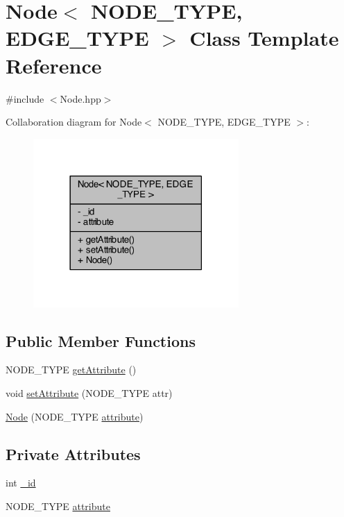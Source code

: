 \hypertarget{class_node}{\section{Node$<$ N\+O\+D\+E\+\_\+\+T\+Y\+P\+E, E\+D\+G\+E\+\_\+\+T\+Y\+P\+E $>$ Class Template Reference}
\label{class_node}
}


{\ttfamily \#include $<$Node.\+hpp$>$}



Collaboration diagram for Node$<$ N\+O\+D\+E\+\_\+\+T\+Y\+P\+E, E\+D\+G\+E\+\_\+\+T\+Y\+P\+E $>$\+:
\nopagebreak
\begin{figure}[H]
\begin{center}
\leavevmode
\includegraphics[width=222pt]{class_node__coll__graph}
\end{center}
\end{figure}
\subsection*{Public Member Functions}
\begin{DoxyCompactItemize}
\item 
N\+O\+D\+E\+\_\+\+T\+Y\+P\+E \hyperlink{class_node_a1272270025389e601164431b42ab5237}{get\+Attribute} ()
\item 
void \hyperlink{class_node_acb8f913ce2f995a6a14b9b05c60938f8}{set\+Attribute} (N\+O\+D\+E\+\_\+\+T\+Y\+P\+E attr)
\item 
\hyperlink{class_node_a94263af6c10cc9882d33918080dc722f}{Node} (N\+O\+D\+E\+\_\+\+T\+Y\+P\+E \hyperlink{class_node_a434cad0f70931bc3aaa048d52d0b0ee3}{attribute})
\end{DoxyCompactItemize}
\subsection*{Private Attributes}
\begin{DoxyCompactItemize}
\item 
int \hyperlink{class_node_a533ab17912d5b919a37ada31a8a78dc4}{\+\_\+id}
\item 
N\+O\+D\+E\+\_\+\+T\+Y\+P\+E \hyperlink{class_node_a434cad0f70931bc3aaa048d52d0b0ee3}{attribute}
\end{DoxyCompactItemize}


